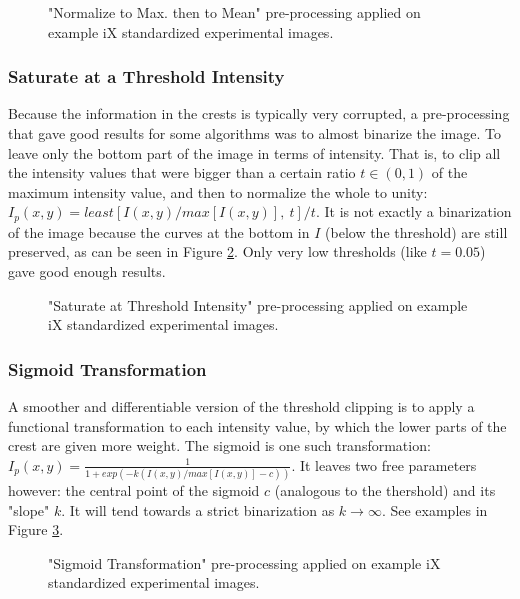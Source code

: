\documentclass[11pt, a4paper, twoside]{article} %
\begin{document}
\begin{figure}[h!] 
     \centering 
    \caption{"Normalize to Max. then to Mean" pre-processing applied on example iX standardized experimental images.}
    \label{fig:preprocessingMean}
\end{figure}

\subsubsection*{Saturate at a Threshold Intensity}
Because the information in the crests is typically very corrupted, a pre-processing that gave good results for some algorithms was to almost binarize the image. To leave only the bottom part of the image in terms of intensity. That is, to clip all the intensity values that were bigger than a certain ratio $t\in(0,1)$ of the maximum intensity value, and then to normalize the whole to unity: $I_p(x,y)=least[I(x,y)/max[I(x,y)],\ t]/t$. It is not exactly a binarization of the image because the curves at the bottom in $I$ (below the threshold) are still preserved, as can be seen in Figure \ref{fig:preprocessingThresh}. Only very low thresholds (like $t=0.05$) gave good enough results.
\begin{figure}[h!] 
     \centering 
    \caption{"Saturate at Threshold Intensity" pre-processing applied on example iX standardized experimental images.}
    \label{fig:preprocessingThresh}
\end{figure}


\subsubsection*{Sigmoid Transformation}

A smoother and differentiable version of the threshold clipping is to apply a functional transformation to each intensity value, by which the lower parts of the crest are given more weight. The sigmoid is one such transformation: $I_p(x,y)=\frac{1}{1+exp(-k(I(x,y)/max[I(x,y)]-c))}$. It leaves two free parameters however: the central point of the sigmoid $c$ (analogous to the thershold) and its "slope" $k$. It will tend towards a strict binarization as $k\rightarrow \infty$. See examples in Figure \ref{fig:preprocessingSigmoid}.
\begin{figure}[h!] 
     \centering 
    \caption{"Sigmoid Transformation" pre-processing applied on example iX standardized experimental images.}
    \label{fig:preprocessingSigmoid}
\end{figure}
\end{document}

